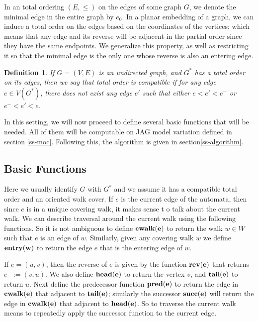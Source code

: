 \documentclass[11pt]{article}
\newcommand{\rev}{\bf rev}
\newcommand{\suc}{\bf succ}
\newcommand{\pred}{\bf pred}
\newcommand{\cwalk}{\bf cwalk}
\newcommand{\entry}{\bf entry}
\newcommand{\head}{\bf head}
\newcommand{\tail}{\bf tail}
\newtheorem{definition}[theorem]{Definition}
\begin{document}
In an total ordering $(E,\le)$ on the edges of some graph $G$, we denote the minimal edge in the 
entire graph by $e_0$.  In a planar embedding of a graph, we can induce a total order on the edges 
based on the coordinates of the vertices; which means that any edge and its reverse will be 
adjacent in the partial order since they have the same endpoints.  We generalize this property, as well 
as restricting it so that the minimal edge is the only one whose reverse is also an entering edge.

\begin{definition}
\label{def-compatible}
If $G=(V,E)$ is an undirected graph, and $G^*$ has a total order on its edges, 
then we say that total order is \emph{compatible} if for 
any edge $e\in V(G^*)$, there does not exist any edge $e'$ 
such that either $e<e'<e^-$ or $e^- < e' < e$.
\end{definition}

In this setting, we will now proceed to define several basic functions that will be needed.  All of them 
will be computable on JAG model variation defined in section \ref{ss-moc}.  Following this, the algorithm 
is given in section\ref{ss-algorithm}.

\subsection{Basic Functions}
\label{ss-basicfunctions}



Here we usually identify $G$ with $G^*$ 
and we assume it has a compatible total order and 
an oriented walk cover.  If $e$ is the current edge of the automata, then since 
$e$ is in a unique covering walk, it makes sense t o
talk about the current walk.  We can describe traversal around the current walk using the following functions.  
So it is not ambiguous to define $\cwalk(e)$ to return the walk $w\in W$ such that $e$ is an edge of $w$.  
Similarly, given any covering walk $w$ we define $\entry(w)$ to return the edge $e$ that is the entering 
edge of $w$.

If $e=(u,v)$, then the 
reverse of $e$ is given by the function $\rev(e)$ that returns $e^- :=(v,u)$.  We also 
define $\head(e)$ to return the vertex $v$, and $\tail(e)$ to return $u$.   
Next define the predecessor function $\pred(e)$ to return the edge in $\cwalk(e)$ that adjacent 
to $\tail(e)$; similarly the successor $\suc(e)$ will return the edge in $\cwalk(e)$ that adjacent 
to $\head(e)$.  So to traverse the current walk means to repeatedly apply the successor function to the current 
edge.  
\end{document}
